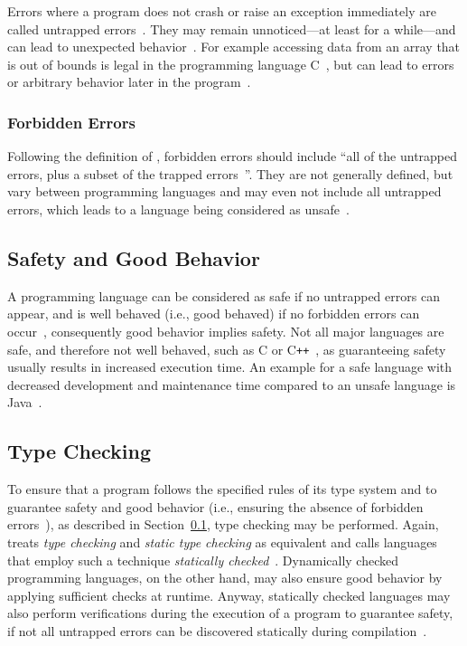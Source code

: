 Errors where a program does not crash or raise an exception immediately are called untrapped errors~\cite[p.~37]{TypeSystems:Cardelli:2004}. They may remain unnoticed---at least for a while---and can lead to unexpected behavior~\cite[p.~3]{TypeSystems:Cardelli:2004}. For example accessing data from an array that is out of bounds is legal in the programming language C~\cite[p.~7]{TypesAndProgrammingLanguages:Pierce:2002}, but can lead to errors or arbitrary behavior later in the program~\cite[p.~3]{TypeSystems:Cardelli:2004}.

\subsubsection{Forbidden Errors}

Following the definition of \citeauthor{TypeSystems:Cardelli:2004}, forbidden errors should include ``all of the untrapped errors, plus a subset of the trapped errors~\cite[p.~3]{TypeSystems:Cardelli:2004}''. They are not generally defined, but vary between programming languages and may even not include all untrapped errors, which leads to a language being  considered as unsafe~\cite[p.~4]{TypeSystems:Cardelli:2004}.

\subsection{Safety and Good Behavior}
\label{sec:safety-good-behavior}

A programming language can be considered as safe if no untrapped errors can appear, and is well behaved (i.e., good behaved) if no forbidden errors can occur~\cite[p.~3]{TypeSystems:Cardelli:2004}, consequently good behavior implies safety. Not all major languages are safe, and therefore not well behaved, such as C or C\texttt{++}~\cite[p.~6]{TypesAndProgrammingLanguages:Pierce:2002}, as guaranteeing safety usually results in increased execution time. An example for a safe language with decreased development and maintenance time compared to an unsafe language is Java~\cite[p.~5]{TypeSystems:Cardelli:2004}.

\subsection{Type Checking}
\label{sec:type-checking}

To ensure that a program follows the specified rules of its type system and to guarantee safety and good behavior (i.e., ensuring the absence of forbidden errors~\cite[p.~37]{TypeSystems:Cardelli:2004}), as described in Section~\ref{sec:safety-good-behavior}, type checking may be performed. Again, \citeauthor{TypeSystems:Cardelli:2004} treats \emph{type checking} and \emph{static type checking} as equivalent and calls languages that employ such a technique \emph{statically checked}~\cite[p.~3]{TypeSystems:Cardelli:2004}. Dynamically checked programming languages, on the other hand, may also ensure good behavior by applying sufficient checks at runtime. Anyway, statically checked languages may also perform verifications during the execution of a program to guarantee safety, if not all untrapped errors can be discovered statically during compilation~\cite[p.~4]{TypeSystems:Cardelli:2004}.

